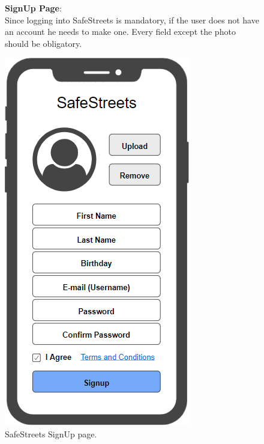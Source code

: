 \begin{figure}
	\begin{flushleft}
		\textbf{SignUp Page}:\\
		Since logging into SafeStreets is mandatory, if the user does not have an account he needs to make one. Every field except the photo should be obligatory.
	\end{flushleft}
	\centering
	\includegraphics[width=0.6\linewidth]{images/mockups/signup}
	\caption{SafeStreets SignUp page.}
	\label{fig:signup}
\end{figure}
\clearpage
